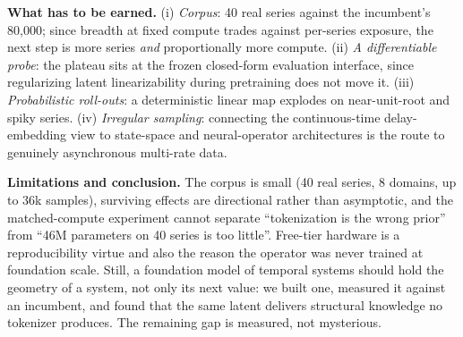 \documentclass{article}
\begin{document}
\textbf{What has to be earned.} (i) \emph{Corpus}: 40 real series against the
incumbent's 80{,}000; since breadth at fixed compute trades against per-series
exposure, the next step is more series \emph{and} proportionally more compute.
(ii) \emph{A differentiable probe}: the plateau sits at the frozen closed-form
evaluation interface, since regularizing latent linearizability during
pretraining does not move it. (iii) \emph{Probabilistic roll-outs}: a
deterministic linear map explodes on near-unit-root and spiky series. (iv)
\emph{Irregular sampling}: connecting the continuous-time delay-embedding view
to state-space and neural-operator architectures is the route to genuinely
asynchronous multi-rate data.

\textbf{Limitations and conclusion.} The corpus is small (40 real series, 8
domains, up to 36k samples), surviving effects are directional rather than
asymptotic, and the matched-compute experiment cannot separate ``tokenization
is the wrong prior'' from ``46M parameters on 40 series is too little''.
Free-tier hardware is a reproducibility virtue and also the reason the operator
was never trained at foundation scale. Still, a foundation model of temporal
systems should hold the geometry of a system, not only its next value: we built
one, measured it against an incumbent, and found that the same latent delivers
structural knowledge no tokenizer produces. The remaining gap is measured, not
mysterious.
\end{document}
